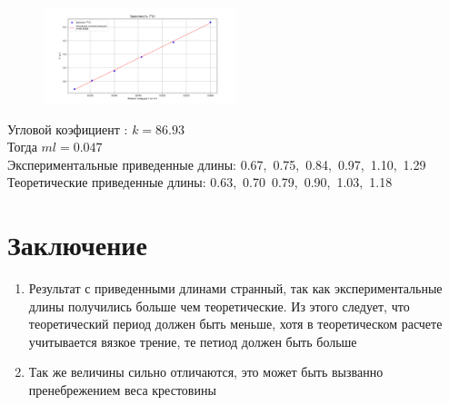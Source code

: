 \documentclass[a4paper]{article}
\begin{document}
\begin{figure}[H]
\centering
\includegraphics[width=0.5\textwidth]{5.png}
\end{figure}
Угловой коэфициент : $k = 86.93$\\
Тогда $ml=0.047$\\

Экспериментальные приведенные длины: 0.67,\, 0.75,\, 0.84,\, 0.97,\, 1.10,\, 1.29\\
Теоретические приведенные длины: 0.63,\, 0.70\, 0.79,\, 0.90,\, 1.03,\, 1.18\\


\section{\textbf{Заключение}}

\begin{enumerate}
\item Результат с приведенными длинами странный, так как экспериментальные длины получились больше чем теоретические. Из этого следует, что теоретический период должен быть меньше, хотя в теоретическом расчете учитывается вязкое трение, те петиод должен быть больше
\item Так же величины сильно отличаются, это может быть вызванно пренебрежением веса крестовины
\end{enumerate}
\end{document}
